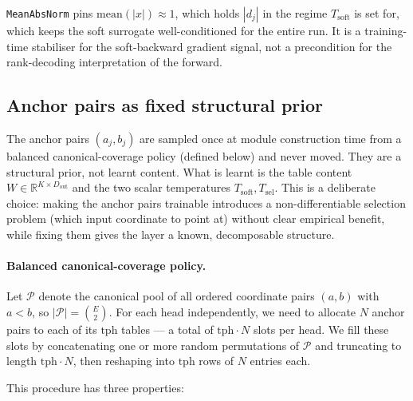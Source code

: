 \documentclass[11pt]{article}
\newcommand{\R}{\mathbb{R}}
\newcommand{\Tsel}{T_{\mathrm{sel}}}
\newcommand{\Tsoft}{T_{\mathrm{soft}}}
\newcommand{\dout}{D_{\mathrm{out}}}
\begin{document}
\texttt{MeanAbsNorm} pins $\mathrm{mean}(|x|) \approx 1$, which holds $|d_j|$ in the regime $\Tsoft$ is set for, which keeps the soft surrogate well-conditioned for the entire run. It is a training-time stabiliser for the soft-backward gradient signal, not a precondition for the rank-decoding interpretation of the forward.

\subsection{Anchor pairs as fixed structural prior}

The anchor pairs $(a_j, b_j)$ are sampled once at module construction time from a balanced canonical-coverage policy (defined below) and never moved. They are a structural prior, not learnt content. What is learnt is the table content $W \in \R^{K \times \dout}$ and the two scalar temperatures $\Tsoft, \Tsel$. This is a deliberate choice: making the anchor pairs trainable introduces a non-differentiable selection problem (which input coordinate to point at) without clear empirical benefit, while fixing them gives the layer a known, decomposable structure.

\paragraph{Balanced canonical-coverage policy.} Let $\mathcal{P}$ denote the canonical pool of all ordered coordinate pairs $(a, b)$ with $a < b$, so $|\mathcal{P}| = \binom{E}{2}$. For each head independently, we need to allocate $N$ anchor pairs to each of its $\mathrm{tph}$ tables --- a total of $\mathrm{tph} \cdot N$ slots per head. We fill these slots by concatenating one or more random permutations of $\mathcal{P}$ and truncating to length $\mathrm{tph} \cdot N$, then reshaping into $\mathrm{tph}$ rows of $N$ entries each.

This procedure has three properties:
\end{document}
